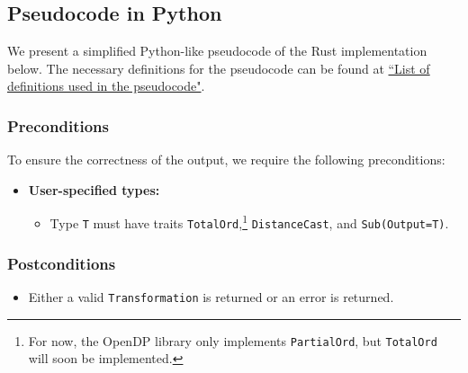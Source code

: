 \documentclass[11pt,a4paper]{article}
\theoremstyle{definition}
\newcommand{\silvia}[1]{{ {\color{blue}{(silvia)~#1}}}}
\begin{document}

\subsection{Pseudocode in Python}\label{sec:pseudocode}
We present a simplified Python-like pseudocode of the Rust implementation below. The necessary definitions for the pseudocode can be found at \href{https://www.overleaf.com/project/60d215bf90b337ac02200a99}{``List of definitions used in the pseudocode"}. 



\subsubsection*{Preconditions}
To ensure the correctness of the output, we require the following preconditions:

\begin{itemize}
    \item \textbf{User-specified types:}
    \begin{itemize}
        \item Type \texttt{T} must have traits \texttt{TotalOrd},\footnote{For now, the OpenDP library only implements \texttt{PartialOrd}, but \texttt{TotalOrd} will soon be implemented.} \texttt{DistanceCast}, and \texttt{Sub(Output=T)}.
    \end{itemize}
\end{itemize}

\subsubsection*{Postconditions}
\begin{itemize}
    \item Either a valid \texttt{Transformation} is returned or an error is returned.
\end{itemize}
\end{document}
